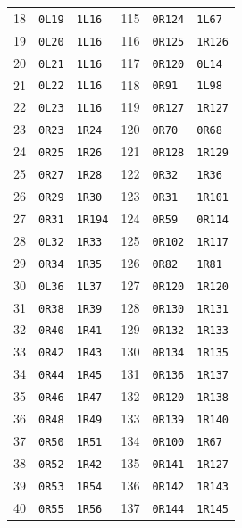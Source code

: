 \begin{longtable}{@{}rll@{\hspace{2em}}rll@{}}
18 & \texttt{0L19} & \texttt{1L16} & 115 & \texttt{0R124} & \texttt{1L67}\\
19 & \texttt{0L20} & \texttt{1L16} & 116 & \texttt{0R125} & \texttt{1R126}\\
20 & \texttt{0L21} & \texttt{1L16} & 117 & \texttt{0R120} & \texttt{0L14}\\
21 & \texttt{0L22} & \texttt{1L16} & 118 & \texttt{0R91} & \texttt{1L98}\\
22 & \texttt{0L23} & \texttt{1L16} & 119 & \texttt{0R127} & \texttt{1R127}\\
23 & \texttt{0R23} & \texttt{1R24} & 120 & \texttt{0R70} & \texttt{0R68}\\
24 & \texttt{0R25} & \texttt{1R26} & 121 & \texttt{0R128} & \texttt{1R129}\\
25 & \texttt{0R27} & \texttt{1R28} & 122 & \texttt{0R32} & \texttt{1R36}\\
26 & \texttt{0R29} & \texttt{1R30} & 123 & \texttt{0R31} & \texttt{1R101}\\
27 & \texttt{0R31} & \texttt{1R194} & 124 & \texttt{0R59} & \texttt{0R114}\\
28 & \texttt{0L32} & \texttt{1R33} & 125 & \texttt{0R102} & \texttt{1R117}\\
29 & \texttt{0R34} & \texttt{1R35} & 126 & \texttt{0R82} & \texttt{1R81}\\
30 & \texttt{0L36} & \texttt{1L37} & 127 & \texttt{0R120} & \texttt{1R120}\\
31 & \texttt{0R38} & \texttt{1R39} & 128 & \texttt{0R130} & \texttt{1R131}\\
32 & \texttt{0R40} & \texttt{1R41} & 129 & \texttt{0R132} & \texttt{1R133}\\
33 & \texttt{0R42} & \texttt{1R43} & 130 & \texttt{0R134} & \texttt{1R135}\\
34 & \texttt{0R44} & \texttt{1R45} & 131 & \texttt{0R136} & \texttt{1R137}\\
35 & \texttt{0R46} & \texttt{1R47} & 132 & \texttt{0R120} & \texttt{1R138}\\
36 & \texttt{0R48} & \texttt{1R49} & 133 & \texttt{0R139} & \texttt{1R140}\\
37 & \texttt{0R50} & \texttt{1R51} & 134 & \texttt{0R100} & \texttt{1R67}\\
38 & \texttt{0R52} & \texttt{1R42} & 135 & \texttt{0R141} & \texttt{1R127}\\
39 & \texttt{0R53} & \texttt{1R54} & 136 & \texttt{0R142} & \texttt{1R143}\\
40 & \texttt{0R55} & \texttt{1R56} & 137 & \texttt{0R144} & \texttt{1R145}\\

\end{longtable}
